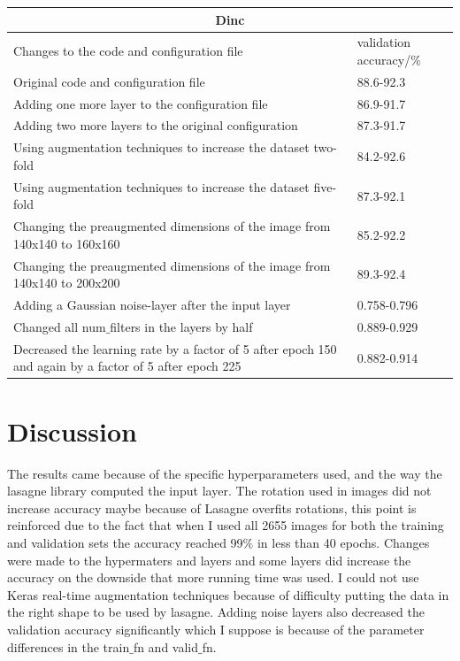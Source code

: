 \documentclass[11pt,twocolumn]{article}
\begin{document}
\begin{tabular}{ |p{5cm}||p{2.8cm}|  }
 \hline
 \multicolumn{2}{|c|}{Dinc} \\
 \hline
 Changes to the code and configuration file & validation accuracy/$\%$\\
 \hline
 Original code and configuration file & 88.6-92.3 \\
 \hline
 Adding one more layer to the configuration file&86.9-91.7 \\
 \hline
 Adding two more layers to the original configuration&87.3-91.7  \\
 \hline
 Using augmentation techniques to increase the dataset two-fold&84.2-92.6 \\
 \hline
 Using augmentation techniques to increase the dataset five-fold&87.3-92.1 \\
 \hline
 Changing the preaugmented dimensions of the image from 140x140 to 160x160&85.2-92.2 \\
 \hline
 Changing the preaugmented dimensions of the image from 140x140 to 200x200&89.3-92.4 \\
 \hline
 Adding a Gaussian noise-layer after the input layer&0.758-0.796 \\
 \hline
 Changed all num$\_$filters in the layers by half&0.889-0.929 \\
 \hline
 Decreased the learning rate by a factor of 5 after epoch 150 and again by a factor of 5 after epoch 225 &0.882-0.914 \\
 \hline
\end{tabular}

\section{Discussion}

The results came because of the specific hyperparameters used, and the way the lasagne library computed the input layer. The rotation used in images did not increase accuracy maybe because of Lasagne overfits rotations, this point is reinforced due to the fact that when I used all 2655 images for both the training and validation sets the accuracy reached 99$\%$ in less than 40 epochs. Changes were made to the hypermaters and layers and some layers did increase the accuracy on the downside that more running time was used. I could not use Keras real-time augmentation techniques because of difficulty putting the data in the right shape to be used by lasagne. Adding noise layers also decreased the validation accuracy significantly which I suppose is because of the parameter differences in the train$\_$fn and valid$\_$fn. 
\end{document}
